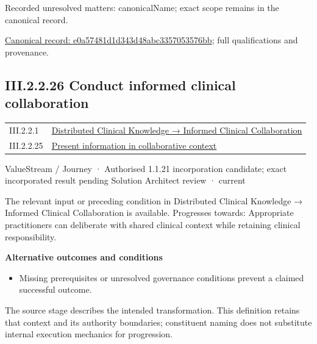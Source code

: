 {\small Recorded unresolved matters: canonicalName; exact scope remains in the canonical record.}\par
{\footnotesize \href{../../../../../../../continuum/strategy/value-stream/e0a57481d1d343d48abc3357053576bb.md}{Canonical record: e0a57481d1d343d48abc3357053576bb}; full qualifications and provenance.}\par
\subsection*{III.2.2.26 Conduct informed clinical collaboration}
\label{navigation:III.2.2.26}

\begin{longtable}{p{.22\linewidth}p{.73\linewidth}}
III.2.2.1 & \hyperref[element:3ba98c0c1170458f8c02fa76694fee67]{Distributed Clinical Knowledge → Informed Clinical Collaboration} \\
III.2.2.25 & \hyperref[element:e0a57481d1d343d48abc3357053576bb]{Present information in collaborative context} \\
\end{longtable}
\label{element:e53b13570f1945829b753d8d7b427fda}
{\small ValueStream / Journey · Authorised 1.1.21 incorporation candidate; exact incorporated result pending Solution Architect review · current}\par

The relevant input or preceding condition in Distributed Clinical Knowledge → Informed Clinical Collaboration is available. Progresses towards: Appropriate practitioners can deliberate with shared clinical context while retaining clinical responsibility.



\par\medskip\textbf{Alternative outcomes and conditions}\par


\begin{itemize}


\item Missing prerequisites or unresolved governance conditions prevent a claimed successful outcome.

\end{itemize}


The source stage describes the intended transformation. This definition retains that context and its authority boundaries; constituent naming does not substitute internal execution mechanics for progression.



